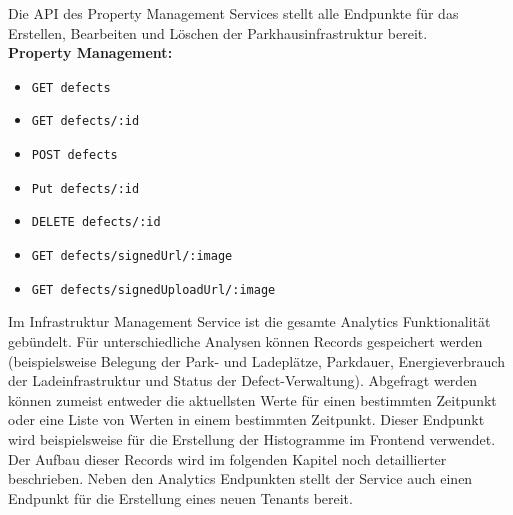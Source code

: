 Die API des Property Management Services stellt alle Endpunkte für das Erstellen, Bearbeiten und Löschen der Parkhausinfrastruktur bereit. \\

\textbf{Property Management:}
\begin{itemize}[noitemsep]
    \item[] \verb|GET defects|
    \item[] \verb|GET defects/:id|
    \item[] \verb|POST defects|
    \item[] \verb|Put defects/:id|
    \item[] \verb|DELETE defects/:id|
    \item[] \verb|GET defects/signedUrl/:image|
    \item[] \verb|GET defects/signedUploadUrl/:image|
\end{itemize}

Im Infrastruktur Management Service ist die gesamte Analytics Funktionalität gebündelt. Für unterschiedliche Analysen können Records gespeichert werden (beispielsweise Belegung der Park- und Ladeplätze, Parkdauer, Energieverbrauch der Ladeinfrastruktur und Status der Defect-Verwaltung). Abgefragt werden können zumeist entweder die aktuellsten Werte für einen bestimmten Zeitpunkt oder eine Liste von Werten in einem bestimmten Zeitpunkt. Dieser Endpunkt wird beispielsweise für die Erstellung der Histogramme im Frontend verwendet. Der Aufbau dieser Records wird im folgenden Kapitel noch detaillierter beschrieben.
Neben den Analytics Endpunkten stellt der Service auch einen Endpunkt für die Erstellung eines neuen Tenants bereit. \\

